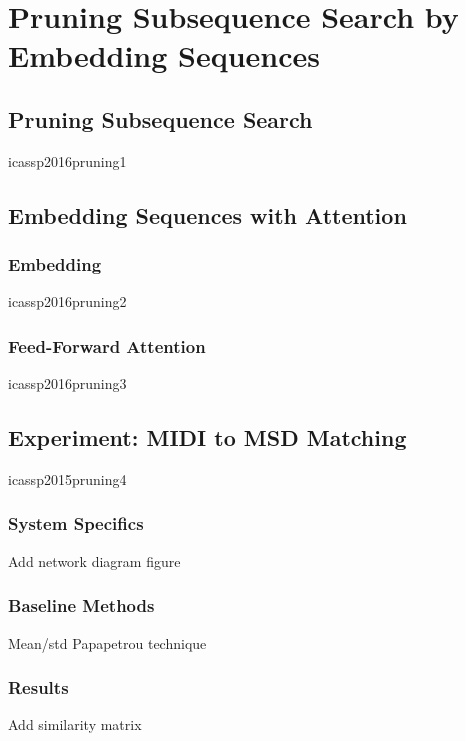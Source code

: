 \chapter{Pruning Subsequence Search by Embedding Sequences}
\label{ch:embedding}

\section{Pruning Subsequence Search}

icassp2016pruning1

\section{Embedding Sequences with Attention}

\subsection{Embedding}

icassp2016pruning2

\subsection{Feed-Forward Attention}

icassp2016pruning3

\section{Experiment: MIDI to MSD Matching}

icassp2015pruning4

\subsection{System Specifics}

Add network diagram figure

\subsection{Baseline Methods}

Mean/std
Papapetrou technique

\subsection{Results}

Add similarity matrix
